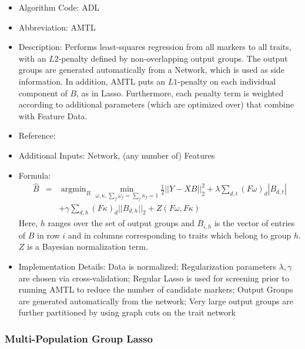 \documentclass{article}
\newcommand{\argmin}{\operatorname{argmin}}
\begin{document}
\begin{itemize}
\item Algorithm Code: ADL
\item Abbreviation: AMTL
\item Description: Performs least-squares regression from all markers to all traits, with an $L2$-penalty defined by non-overlapping output groups. The output groups are generated automatically from a Network, which is used as side information. In addition, AMTL puts an $L1$-penalty on each individual component of $B$, as in Lasso. Furthermore, each penalty term is weighted according to additional parameters (which are optimized over) that combine with Feature Data.
\item Reference: \cite{TreeLasso}
\item Additional Inputs: Network, (any number of) Features
\item Formula:
\begin{eqnarray*}
\hat{B} &=& \argmin_{B} \min_{\omega, \kappa, \sum_f \omega_f = \sum_f \kappa_f = 1} \frac{1}{2}||Y - XB||_2^2 + \lambda \sum_{d,t}(F\omega)_d|B_{d,t}|\\
&& + \gamma \sum_{d,h}(F\kappa)_d||B_{d,h}||_2 + Z(F\omega, F\kappa)
\end{eqnarray*}
Here, $h$ ranges over the set of output groups and $B_{i,h}$ is the vector of entries of $B$ in row $i$ and in columns corresponding to traits which belong to group $h$. $Z$ is a Bayesian normalization term.
\item Implementation Details: Data is normalized; Regularization parameters $\lambda, \gamma$ are chosen via cross-validation; Regular Lasso is used for screening prior to running AMTL to reduce the number of candidate markers; Output Groups are generated automatically from the network; Very large output groups are further partitioned by using graph cuts on the trait network
\end{itemize}

\subsubsection{Multi-Population Group Lasso}
\end{document}
